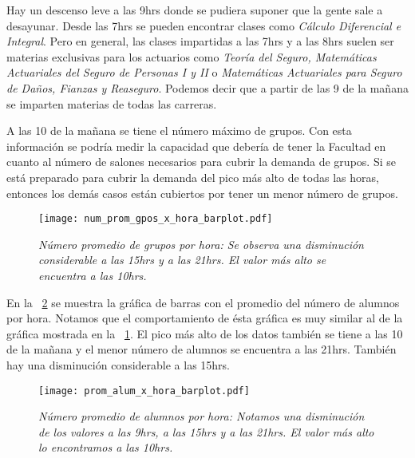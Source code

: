Hay un descenso leve a las 9hrs donde se pudiera suponer que la gente sale a desayunar. Desde las 7hrs se pueden encontrar clases como \textit{Cálculo Diferencial e Integral}. Pero en general, las clases impartidas a las 7hrs y a las 8hrs suelen ser materias exclusivas para los actuarios como \textit{Teoría del Seguro, Matemáticas Actuariales del Seguro de Personas I y II} o \textit{Matemáticas Actuariales para Seguro de Daños, Fianzas y Reaseguro}. Podemos decir que a partir de las 9 de la mañana se imparten materias de todas las carreras.


A las 10 de la mañana se tiene el número máximo de grupos. Con esta información se podría medir la capacidad que debería de tener la Facultad en cuanto al número de salones necesarios para cubrir la demanda de grupos. Si se está preparado para cubrir la demanda del pico más alto de todas las horas, entonces los demás casos están cubiertos por tener un menor número de grupos.


\begin{figure}[H]
\centering
\texttt{[image: num\_prom\_gpos\_x\_hora\_barplot.pdf]} %
\caption[\textit{Número promedio de grupos por hora}]{\textit{Número promedio de grupos por hora: Se observa una disminución considerable a las 15hrs y a las 21hrs. El valor más alto se encuentra a las 10hrs.}}\label{num_prom_gpos_x_hora_barplot}
\end{figure}

En la \figurename{~\ref{prom_alum_x_hora_barplot}} se muestra la gráfica de barras con el promedio del número de alumnos por hora. Notamos que el comportamiento de ésta gráfica es muy similar al de la gráfica mostrada en la \figurename{~\ref{num_prom_gpos_x_hora_barplot}}. El pico más alto de los datos también se tiene a las 10 de la mañana y el menor número de alumnos se encuentra a las 21hrs. También hay una disminución considerable a las 15hrs.

\begin{figure}[H]
\centering
\texttt{[image: prom\_alum\_x\_hora\_barplot.pdf]} %
\caption[\textit{Número promedio de alumnos por hora}]{\textit{Número promedio de alumnos por hora: Notamos una disminución de los valores a las 9hrs, a las 15hrs y a las 21hrs. El valor más alto lo encontramos a las 10hrs.}}\label{prom_alum_x_hora_barplot}
\end{figure}

